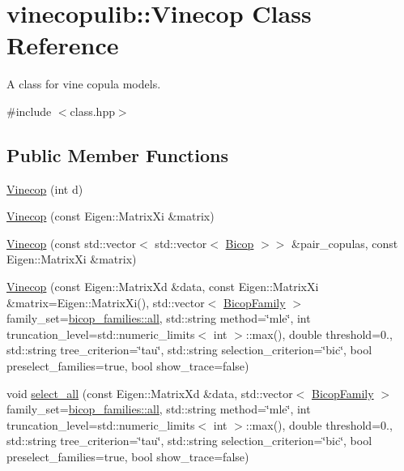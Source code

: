 \hypertarget{classvinecopulib_1_1_vinecop}{}\section{vinecopulib\+:\+:Vinecop Class Reference}
\label{classvinecopulib_1_1_vinecop}


A class for vine copula models.  




{\ttfamily \#include $<$class.\+hpp$>$}

\subsection*{Public Member Functions}
\begin{DoxyCompactItemize}
\item 
\hyperlink{classvinecopulib_1_1_vinecop_a7c6bae90feba9d70bf692e4d50d02bc7}{Vinecop} (int d)
\item 
\hyperlink{classvinecopulib_1_1_vinecop_a561fc84ab874520e6dab9107fc45579a}{Vinecop} (const Eigen\+::\+Matrix\+Xi \&matrix)
\item 
\hyperlink{classvinecopulib_1_1_vinecop_a013a9d4eef7eb5e615a18bb3c36fd5dc}{Vinecop} (const std\+::vector$<$ std\+::vector$<$ \hyperlink{classvinecopulib_1_1_bicop}{Bicop} $>$$>$ \&pair\+\_\+copulas, const Eigen\+::\+Matrix\+Xi \&matrix)
\item 
\hyperlink{classvinecopulib_1_1_vinecop_ae74d750f9f59c33cbb2047347c44a530}{Vinecop} (const Eigen\+::\+Matrix\+Xd \&data, const Eigen\+::\+Matrix\+Xi \&matrix=Eigen\+::\+Matrix\+Xi(), std\+::vector$<$ \hyperlink{namespacevinecopulib_a42e95cc06d33896199caab0c11ad44f3}{Bicop\+Family} $>$ family\+\_\+set=\hyperlink{namespacevinecopulib_1_1bicop__families_a5214a513f41ec23b74782aab96ea6774}{bicop\+\_\+families\+::all}, std\+::string method=\char`\"{}mle\char`\"{}, int truncation\+\_\+level=std\+::numeric\+\_\+limits$<$ int $>$\+::max(), double threshold=0., std\+::string tree\+\_\+criterion=\char`\"{}tau\char`\"{}, std\+::string selection\+\_\+criterion=\char`\"{}bic\char`\"{}, bool preselect\+\_\+families=true, bool show\+\_\+trace=false)
\item 
void \hyperlink{classvinecopulib_1_1_vinecop_a6f9f35b5973e0da272770706af77dc11}{select\+\_\+all} (const Eigen\+::\+Matrix\+Xd \&data, std\+::vector$<$ \hyperlink{namespacevinecopulib_a42e95cc06d33896199caab0c11ad44f3}{Bicop\+Family} $>$ family\+\_\+set=\hyperlink{namespacevinecopulib_1_1bicop__families_a5214a513f41ec23b74782aab96ea6774}{bicop\+\_\+families\+::all}, std\+::string method=\char`\"{}mle\char`\"{}, int truncation\+\_\+level=std\+::numeric\+\_\+limits$<$ int $>$\+::max(), double threshold=0., std\+::string tree\+\_\+criterion=\char`\"{}tau\char`\"{}, std\+::string selection\+\_\+criterion=\char`\"{}bic\char`\"{}, bool preselect\+\_\+families=true, bool show\+\_\+trace=false)
$$
\end{DoxyCompactItemize}
